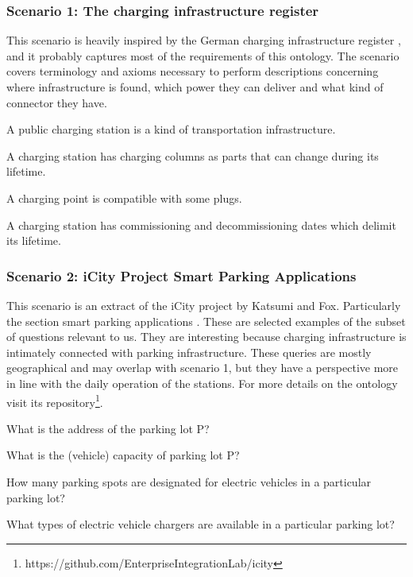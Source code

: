 \subsubsection*{Scenario 1: The charging infrastructure register}

This scenario is heavily inspired by the German charging infrastructure register
\cite{Bundesnetzagentur.27Oct2023}, and it probably captures most of the
requirements of this ontology. The scenario covers terminology and axioms
necessary to perform descriptions concerning where infrastructure is found,
which power they can deliver and what kind of connector they have.

\begin{namedbreak}
    A public charging station is a kind of transportation infrastructure.
\end{namedbreak}
\begin{namedbreak}\label{CQ1.1}
    A charging station has charging columns as parts that can change during its lifetime.
\end{namedbreak}
\begin{namedbreak}
    A charging point is compatible with some plugs.
\end{namedbreak}
\begin{namedbreak}
    A charging station has commissioning and decommissioning dates which delimit its lifetime.
\end{namedbreak}

\subsubsection*{Scenario 2: iCity Project Smart Parking Applications}

This scenario is an extract of the iCity project by Katsumi and Fox.
Particularly the section smart parking applications \cite{Katsumi.2020}. These
are selected examples of the subset of questions relevant to us. They are
interesting because charging infrastructure is intimately connected with parking
infrastructure. These queries are mostly geographical and may overlap with
scenario 1, but they have a perspective more in line with the daily operation of
the stations. For more details on the ontology visit its
repository\footnote{https://github.com/EnterpriseIntegrationLab/icity}.


\begin{namedbreak}\label{CQ2.0}
    What is the address of the parking lot P?
\end{namedbreak}
\begin{namedbreak}\label{CQ2.1}
    What is the (vehicle) capacity of parking lot P?
\end{namedbreak}
\begin{namedbreak}
    How many parking spots are designated for electric vehicles in a particular
    parking lot?
\end{namedbreak}
\begin{namedbreak}
    What types of electric vehicle chargers are available in a particular
    parking lot?
\end{namedbreak}